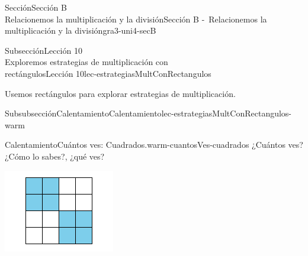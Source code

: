 \begin{sectionptx}{Sección}{{\Large Sección B\\}Relacionemos la multiplicación y la división}{}{Sección B -~Relacionemos la multiplicación y la división}{}{}{gra3-uni4-secB}
\begin{subsectionptx}{Subsección}{{\normalsize Lección 10\\[-0.05cm]}Exploremos estrategias de multiplicación con\\rectángulos}{}{Lección 10}{}{}{lec-estrategiasMultConRectangulos}
\begin{introduction}{}%
Usemos rectángulos para explorar estrategias de multiplicación.%
\end{introduction}%
%
%
\typeout{************************************************}
\typeout{************************************************}
%
\begin{subsubsectionptx}{Subsubsección}{Calentamiento}{}{Calentamiento}{}{}{lec-estrategiasMultConRectangulos-warm}
\begin{exploration}{Calentamiento}{Cuántos ves: Cuadrados.}{warm-cuantosVes-cuadrados}%
¿Cuántos ves?\\
 ¿Cómo lo sabes?, ¿qué ves?%
\begin{sidebyside}{3}{0}{0}{0.05}%
\begin{sbspanel}{0.3}%
\includegraphics[max width=\linewidth, center]{external/svg-source/tikz-file-147481.pdf}
\end{sbspanel}%
\begin{sbspanel}{0.3}%

\end{sbspanel}
\end{sidebyside}
\end{exploration}
\end{subsubsectionptx}
\end{subsectionptx}
\end{sectionptx}
